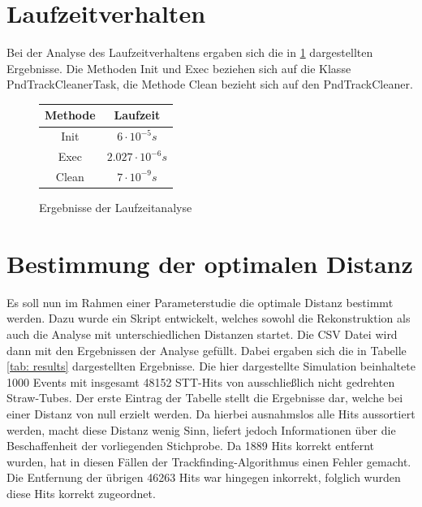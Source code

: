 \section{Laufzeitverhalten}
Bei der Analyse des Laufzeitverhaltens ergaben sich die in \ref{tab: resultsRuntime} dargestellten Ergebnisse. Die Methoden Init und Exec beziehen sich auf die Klasse PndTrackCleanerTask, die Methode Clean bezieht sich auf den PndTrackCleaner.

\begin{figure}
\begin{center}
\begin{tabular}{ |c|c|}
	\hline
	Methode & Laufzeit\\
	\hline
	Init & $6 \cdot 10^{-5} s$ \\
	Exec & $2.027 \cdot 10^{-6} s$\\
	Clean & $7 \cdot 10^{-9} s$\\
	\hline
\end{tabular}
\end{center}
\caption{Ergebnisse der Laufzeitanalyse}
\label{tab: resultsRuntime}
\end{figure}

\section{Bestimmung der optimalen Distanz}
Es soll nun im Rahmen einer Parameterstudie die optimale Distanz bestimmt werden. Dazu wurde ein Skript entwickelt, welches sowohl die Rekonstruktion als auch die Analyse mit unterschiedlichen Distanzen startet. Die CSV Datei wird dann mit den Ergebnissen der Analyse gefüllt. Dabei ergaben sich die in Tabelle \ref{tab: results} dargestellten Ergebnisse. Die hier dargestellte Simulation beinhaltete 1000 Events mit insgesamt 48152 STT-Hits von ausschließlich nicht gedrehten Straw-Tubes. Der erste Eintrag der Tabelle stellt die Ergebnisse dar, welche bei einer Distanz von null erzielt werden. Da hierbei ausnahmslos alle Hits aussortiert werden, macht diese Distanz wenig Sinn, liefert jedoch Informationen über die Beschaffenheit der vorliegenden Stichprobe. Da 1889 Hits korrekt entfernt wurden, hat in diesen Fällen der Trackfinding-Algorithmus einen Fehler gemacht. Die Entfernung der übrigen 46263 Hits war hingegen inkorrekt, folglich wurden diese Hits korrekt zugeordnet.

